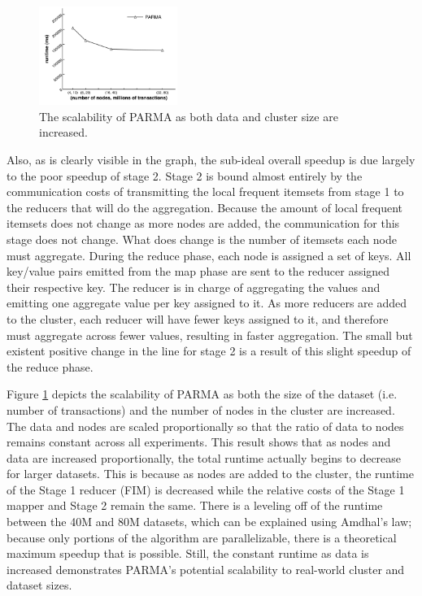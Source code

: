 \begin{figure}[tb]
 \centering
    \includegraphics[width=0.4\textwidth]{parma/scalability}
  \caption{The scalability of PARMA as both data and cluster size are increased.}
\label{fig:scalability}
\end{figure}

Also, as is clearly visible in the graph, the sub-ideal overall
speedup is due largely to the poor speedup of stage 2. Stage 2 is
bound almost entirely by the communication costs of transmitting the
local frequent itemsets from stage 1 to the reducers that will do the
aggregation. Because the amount of local frequent itemsets does not
change as more nodes are added, the communication for this stage does
not change. What does change is the number of itemsets each node must
aggregate. During the reduce phase, each node is assigned a set of
keys. All key/value pairs emitted from the map phase are sent to the
reducer assigned their respective key. The reducer is in charge of
aggregating the values and emitting one aggregate value per key assigned
to it. As more reducers are added to the cluster, each reducer will
have fewer keys assigned to it, and therefore must aggregate across
fewer values, resulting in faster aggregation. The small but existent positive
change in the line for stage 2 is a result of this slight speedup of the reduce
phase. 

Figure \ref{fig:scalability} depicts the scalability of PARMA as both
the size of the dataset (i.e. number of transactions) and the number of
nodes in the cluster are increased. The data and nodes are scaled
proportionally so that the ratio of data to nodes remains constant
across all experiments. This result shows that as nodes and data are
increased proportionally, the total runtime actually begins to decrease
for larger datasets. This is because as nodes are added to the cluster, the runtime of
the Stage 1 reducer (FIM) is decreased while the relative costs of
the Stage 1 mapper and Stage 2 remain the same. There is a leveling
off of the runtime between the 40M and 80M datasets, which can be
explained using Amdhal's law; because only portions of the algorithm
are parallelizable, there is a theoretical maximum speedup that is
possible. Still, the constant runtime as data is increased
demonstrates PARMA's potential scalability to real-world cluster and
dataset sizes. 

